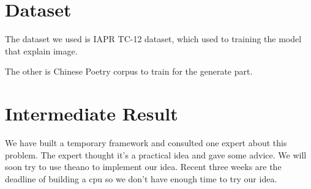 \documentclass[10pt,twocolumn,letterpaper]{article}
\begin{document}
\section{Dataset}
The dataset we used is IAPR TC-12 dataset, which used to training the model that explain image. 

The other is Chinese Poetry corpus to train for the generate part.
\section{Intermediate Result}
We have built a temporary framework and consulted one expert about this problem. The expert thought it's a practical idea and gave some advice.
We will soon try to use theano to implement our idea. Recent three weeks are the deadline of building a cpu so we don't have enough time to try our idea.
\end{document}
